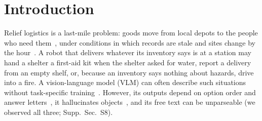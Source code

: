 \documentclass[conference]{IEEEtran}
\begin{document}
\section{Introduction}
Relief logistics is a last-mile problem: goods move from local depots to the people who need them~\cite{balcik2008lastmile}, under
conditions in which records are stale and sites change by the hour~\cite{murphy2014disaster}. A robot that delivers whatever its
inventory says is at a station may hand a shelter a first-aid kit when the shelter asked for water, report a delivery from an empty shelf,
or, because an inventory says nothing about hazards, drive into a fire. A vision-language model (VLM) can often describe such situations without task-specific
training~\cite{liu2023reflect,duan2025aha,agia2025sentinel}. However, its outputs depend on option order and answer letters~\cite{zheng2024mcselectors,pezeshkpour2024order},
it hallucinates objects~\cite{li2023pope}, and its free text can be unparseable (we observed all three; Supp.~Sec.~S8).
\end{document}
